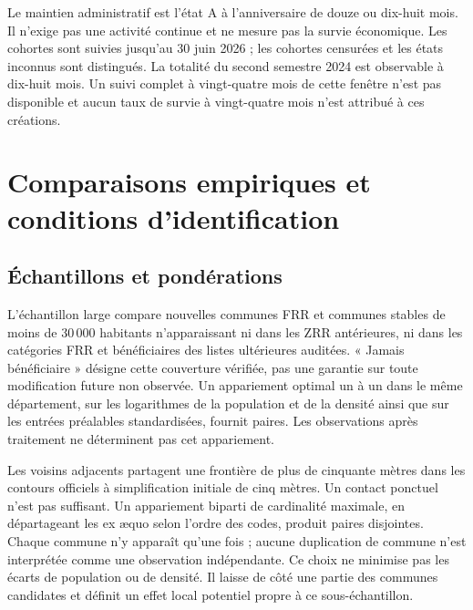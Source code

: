 Le maintien administratif est l’état A à l’anniversaire de douze ou dix-huit mois. Il n’exige pas une activité continue et ne mesure pas la survie économique. Les cohortes sont suivies jusqu’au 30 juin 2026 ; les cohortes censurées et les états inconnus sont distingués. La totalité du second semestre 2024 est observable à dix-huit mois. Un suivi complet à vingt-quatre mois de cette fenêtre n’est pas disponible et aucun taux de survie à vingt-quatre mois n’est attribué à ces créations.

\begin{table}[htbp]\centering\small\caption{Statistiques de l’échantillon large}\label{tab:summary}\end{table}

\section{Comparaisons empiriques et conditions d’identification}
\subsection{Échantillons et pondérations}
L’échantillon large compare \NewN{} nouvelles communes FRR et \ControlN{} communes stables de moins de 30\,000 habitants n’apparaissant ni dans les ZRR antérieures, ni dans les catégories FRR et bénéficiaires des listes ultérieures auditées. « Jamais bénéficiaire » désigne cette couverture vérifiée, pas une garantie sur toute modification future non observée. Un appariement optimal un à un dans le même département, sur les logarithmes de la population et de la densité ainsi que sur les entrées préalables standardisées, fournit \MatchedPairs{} paires. Les observations après traitement ne déterminent pas cet appariement.

Les voisins adjacents partagent une frontière de plus de cinquante mètres dans les contours officiels à simplification initiale de cinq mètres. Un contact ponctuel n’est pas suffisant. Un appariement biparti de cardinalité maximale, en départageant les ex æquo selon l’ordre des codes, produit \BorderPairs{} paires disjointes. Chaque commune n’y apparaît qu’une fois ; aucune duplication de commune n’est interprétée comme une observation indépendante. Ce choix ne minimise pas les écarts de population ou de densité. Il laisse de côté une partie des communes candidates et définit un effet local potentiel propre à ce sous-échantillon.

